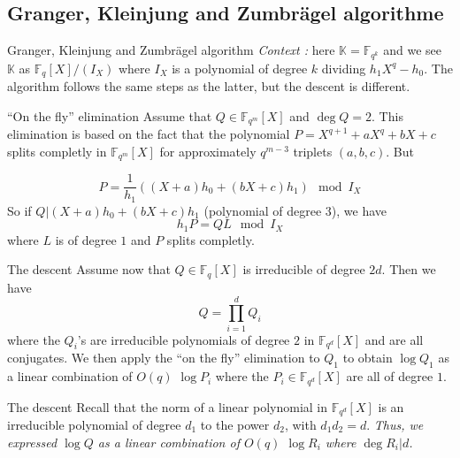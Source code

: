 \documentclass[xcolor=x11names,compress]{beamer}
\theoremstyle{break}
\theoremstyle{sc}
\theoremstyle{definition}
\theoremstyle{remark}
\begin{document}
\subsection{Granger, Kleinjung and Zumbrägel algorithme}

\begin{frame}{Granger, Kleinjung and Zumbrägel algorithm}
  \emph{Context :} here $\mathbb{K}=\mathbb{F}_{q^k}$ and we see $\mathbb{K}$ as
  $\mathbb{F}_q[X]/(I_X)$ where $I_X$ is a polynomial of degree $k$ dividing
  $h_1X^q-h_0$. The algorithm follows the same steps as the latter, but the
  descent is different.
\end{frame}

\begin{frame}{``On the fly'' elimination}
  Assume that $Q\in \mathbb{F}_{q^m}[X]$ and $\deg Q = 2$. This elimination is
  based on the fact that the polynomial $P = X^{q+1}+aX^q+bX+c$ splits completly
  in $\mathbb{F}_{q^m}[X]$ for approximately $q^{m-3}$ triplets $(a, b, c)$. But
  
  \[
    P = \frac{1}{h_1}((X+a)h_0 + (bX+c)h_1)\mod I_X
  \]
  So if $Q| (X+a)h_0 + (bX+c)h_1$ (polynomial of degree $3$), we have 
  \[
    h_1P=QL \mod I_X
  \]
  where $L$ is of degree $1$ and $P$ splits completly.

\end{frame}

\begin{frame}{The descent}
  Assume now that $Q\in\mathbb{F}_{q}[X]$ is irreducible of degree $2d$. Then we
  have
  \[
    Q=\prod_{i=1}^d Q_i
  \]
  where the $Q_i$'s are irreducible polynomials of degree $2$ in
  $\mathbb{F}_{q^d}[X]$ and are all conjugates. We then apply the ``on the fly''
  elimination to $Q_1$ to obtain $\log Q_1$ as a linear combination of 
  $O(q)$ $\log P_i$ where the $P_i\in \mathbb{F}_{q^d}[X]$ are all of degree $1$.
\end{frame}
  
\begin{frame}{The descent}
  Recall that the norm of a linear polynomial in $\mathbb{F}_{q^d}[X]$ is an irreducible
  polynomial of degree $d_1$ to the power $d_2$, with $d_1d_2 = d$.
  \emph{Thus, we expressed $\log Q$ as a linear combination of $O(q)$ $\log
  R_i$ where $\deg R_i | d$.}
\end{frame}

\end{document}
